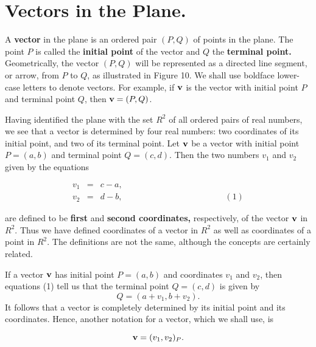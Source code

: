\section{Vectors in the Plane.} A \textbf{vector} in the plane is an ordered pair $(P, Q)$ of points in the plane. The point $P$ is called the \textbf{initial point} of the vector and $Q$ the \textbf{terminal point.} Geometrically, the vector $(P, Q)$ will be represented as a directed line segment, or arrow, from $P$ to $Q$, as illustrated in Figure 10. We shall use boldface lower-case letters to denote vectors. For example, if $\mbox{\bf{v}}$ is the vector with initial point $P$ and terminal point $Q$, then $\mbox{\bf{v}} = (P, Q)$.


Having identified the plane with the set $R^2$ of all ordered pairs of real numbers, we see that a vector is determined by four real numbers: two coordinates of its initial point, and two of its terminal point. Let $\mbox{\bf{v}}$ be a vector with initial point $P = (a, b)$ and terminal point $Q = (c, d)$. Then the two numbers $v_1$ and $v_2$ given by the equations

\begin{eqnarray*}
v_1 &=& c - a,\\
v_2 &=& d - b, \hspace{2in} (1)
\label{eq10.3.1}
\end{eqnarray*}

\noindent are defined to be \textbf{first} and \textbf{second coordinates,} respectively, of the vector $\mbox{\bf{v}}$ in $R^2$. Thus we have defined coordinates of a vector in $R^2$ as well as coordinates of a point in $R^2$. The definitions are not the same, although the concepts are certainly related.

If a vector $\mbox{\bf{v}}$ has initial point $P = (a, b)$ and coordinates $v_1$ and $v_2$, then equations (1) tell us that the terminal point $Q = (c, d)$ is given by
$$
Q = (a + v_1, b + v_2).
$$
\noindent It follows that a vector is completely determined by its initial point and its coordinates. Hence, another notation for a vector, which we shall use, is

\setcounter{equation}{1}
\begin{equation}
\mbox{\bf{v}} = (v_1, v_2)_P .  
\label{eq10.3.2}
\end{equation}

